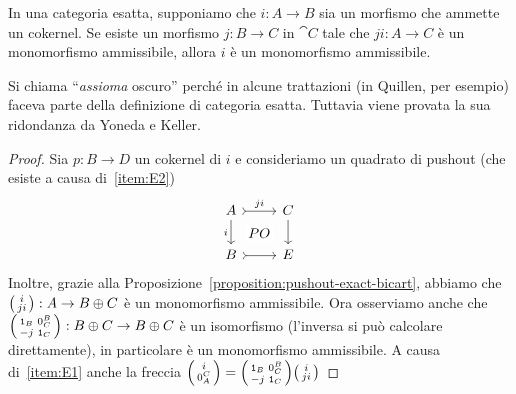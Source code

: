 \begin{proposition}
  \label{proposition:ObscureAxiom}
  In una categoria esatta, supponiamo che \(i: A \to B\) sia un morfismo
  che ammette un cokernel. Se esiste un morfismo \(j: B \to C\) in
  \(\cat C\) tale che \(ji : A \to C\) è un monomorfismo ammissibile,
  allora \(i\) è un monomorfismo ammissibile.
\end{proposition}

\begin{remark}
  Si chiama ``{\em assioma} oscuro'' perché in alcune trattazioni (in
  Quillen, per esempio) faceva parte della definizione di categoria
  esatta. Tuttavia viene provata la sua ridondanza da Yoneda e
  Keller.
\end{remark}

\begin{proof}
  Sia \(p: B \to D\) un cokernel di \(i\) e consideriamo un quadrato di
  pushout (che esiste a causa di~\ref{item:E2})
  \[
    \begin{tikzcd}
      A \ar["{i}", d, swap] \ar["{PO}" description, phantom, dr]
      \ar["{ji}", rightarrowtail, r] & C \ar["{}", d] \\
      B \ar["{}", rightarrowtail, r] & E
    \end{tikzcd}
  \]
  Inoltre, grazie alla
  Proposizione~\ref{proposition:pushout-exact-bicart}, abbiamo che
  \(\begin{psmallmatrix} i \\ ji \end{psmallmatrix}: A \to B \oplus C\)
  è un monomorfismo ammissibile. Ora osserviamo anche che
  \(\begin{psmallmatrix} \mathtt 1_B & 0_C^B \\ -j & \mathtt 1_C \end{psmallmatrix}:
  B \oplus C \to B \oplus C\) è un isomorfismo (l'inversa si può
  calcolare direttamente), in particolare è un monomorfismo
  ammissibile. A causa di~\ref{item:E1} anche la freccia
  \(\begin{psmallmatrix} i \\ 0_A^C \end{psmallmatrix} =
  \begin{psmallmatrix}
    \mathtt 1_B & 0_C^B \\
    - j & \mathtt 1_C
  \end{psmallmatrix}
  \begin{psmallmatrix}
    i \\
    ji
  \end{psmallmatrix}\)

\end{proof}
